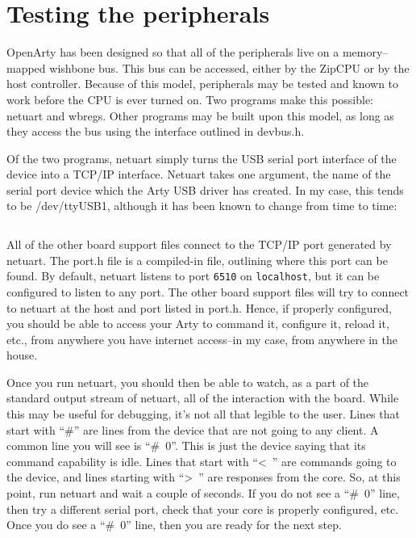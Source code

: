 \documentclass{gqtekspec}
\begin{document}
\section{Testing the peripherals}
OpenArty has been designed so that all of the peripherals live on a 
memory--mapped wishbone bus.  This bus can be accessed, either by the ZipCPU
or by the host controller.  Because of this model, peripherals may be tested
and known to work before the CPU is ever turned on.  Two programs make this
possible: netuart and wbregs.  Other programs may be built upon this model,
as long as they access the bus using the interface outlined in devbus.h.

Of the two programs, netuart simply turns the USB serial port interface of
the device into a TCP/IP interface.  Netuart takes one argument, the 
name of the serial port device which the Arty USB driver has created.  In
my case, this tends to be /dev/ttyUSB1, although it has been known to change
from time to time:

\begin{lstlisting}[language=bash]
% netuart /dev/ttyUSB1
\end{lstlisting} 

All of the other board support files connect to the TCP/IP port generated
by netuart.  The port.h file is a compiled-in file, outlining where this
port can be found.  By default, netuart listens to port {\tt 6510} on
{\tt localhost}, but it can be configured to listen to any port.  The other
board support files will try to connect to netuart at the host and port
listed in port.h.  Hence, if properly configured, you should be able to 
access your Arty to command it, configure it, reload it, etc., from anywhere
you have internet access--in my case, from anywhere in the house.

Once you run netuart, you should then be able to watch, as a part of the
standard output stream of netuart, all of the interaction with the board.
While this may be useful for debugging, it's not all that legible to the
user.   Lines that start with \hbox{``\#''} are lines from the device that are not
going to any client.  A common line you will see is \hbox{``\# 0''}.  This is
just the device saying that its command capability is idle.  Lines that start
with \hbox{``< ''} are commands going to the device, and lines starting with
\hbox{``> ''} are responses from the core.  So, at this point, run netuart and
wait a couple of seconds.  If you do not see a \hbox{``\# 0''} line, then try a
different serial port, check that your core is properly configured, etc.  Once
you do see a \hbox{``\# 0''} line, then you are ready for the next step.
\end{document}
